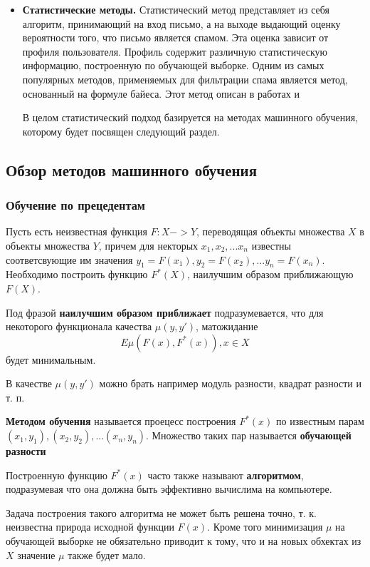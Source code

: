 \begin{itemize}
	\item \textbf{Статистические методы.} Статистический метод представляет из себя алгоритм, принимающий на вход письмо, а на выходе выдающий оценку вероятности того, что письмо является спамом. Эта оценка зависит от профиля пользователя. Профиль содержит различную статистическую информацию, построенную по обучающей выборке. Одним из самых популярных методов, применяемых для фильтрации спама является метод, основанный на формуле байеса. Этот метод описан в работах \cite{PLANFORSPAM} и \cite{ROBINSON} 

	В целом статистический подход базируется на методах машинного обучения, которому будет посвящен следующий раздел.
\end{itemize}


\subsection{Обзор методов машинного обучения} 
\subsubsection{Обучение по прецедентам}
Пусть есть неизвестная функция $F: X -> Y$, переводящая объекты
множества $X$ в объекты множества $Y$, причем для некторых $x_1, x_2, ... x_n$ известны соответсвующие им значения $y_1 = F(x_1), y_2 = F(x_2), ... y_n = F(x_n)$.
Необходимо построить функцию $F^*(X)$, наилучшим образом приближающую $F(X)$.

Под фразой \textbf{наилучшим образом приближает} подразумевается, что для некоторого функционала качества $\mu(y, y')$, матожидание
\begin{equation}
\label{}
E\mu(F(x), F^*(x)), x \in X
\end{equation}
будет минимальным.

В качестве $\mu(y, y')$ можно брать например модуль разности, квадрат разности и т. п.

\textbf{Методом обучения} называется проецесс построения $F^*(x)$ по известным парам $(x_1, y_1), (x_2, y_2), ... (x_n, y_n)$. Множество таких пар называется \textbf{обучающей разности}

Построенную функцию $F^*(x)$ часто также называют \textbf{алгоритмом}, подразумевая что она должна быть эффективно вычислима на компьютере.

Задача построения такого алгоритма не может быть решена точно, т. к. неизвестна природа исходной функции $F(x)$. Кроме того минимизация $\mu$ на обучающей выборке не обязательно приводит к тому, что и на новых обхектах из $X$ значение $\mu$ также будет мало.

